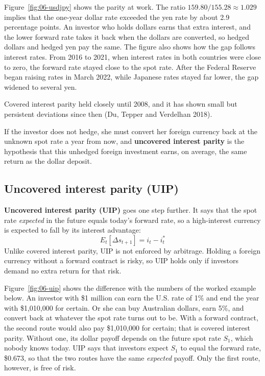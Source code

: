 Figure~\ref{fig:06-usdjpy} shows the parity at work. The ratio $159.80/155.28 \approx 1.029$ implies that the one-year dollar rate exceeded the yen rate by about 2.9 percentage points. An investor who holds dollars earns that extra interest, and the lower forward rate takes it back when the dollars are converted, so hedged dollars and hedged yen pay the same. The figure also shows how the gap follows interest rates. From 2016 to 2021, when interest rates in both countries were close to zero, the forward rate stayed close to the spot rate. After the Federal Reserve began raising rates in March 2022, while Japanese rates stayed far lower, the gap widened to several yen.

Covered interest parity held closely until 2008, and it has shown small but persistent deviations since then (Du, Tepper and Verdelhan 2018).

If the investor does not hedge, she must convert her foreign currency back at the unknown spot rate a year from now, and \textbf{uncovered interest parity} is the hypothesis that this unhedged foreign investment earns, on average, the same return as the dollar deposit.

\subsection{Uncovered interest parity (UIP)}

\textbf{Uncovered interest parity (UIP)} goes one step further. It says that the spot rate \emph{expected} in the future equals today's forward rate, so a high-interest currency is expected to fall by its interest advantage:
\begin{equation}
  E_t[\Delta s_{t+1}] = i_t - i^*_t
  \label{eq:06-uip}
\end{equation}
Unlike covered interest parity, UIP is not enforced by arbitrage. Holding a foreign currency without a forward contract is risky, so UIP holds only if investors demand no extra return for that risk.

Figure~\ref{fig:06-uip} shows the difference with the numbers of the worked example below. An investor with \$1 million can earn the U.S. rate of 1\% and end the year with \$1,010,000 for certain. Or she can buy Australian dollars, earn 5\%, and convert back at whatever the spot rate turns out to be. With a forward contract, the second route would also pay \$1,010,000 for certain; that is covered interest parity. Without one, its dollar payoff depends on the future spot rate $S_1$, which nobody knows today. UIP says that investors expect $S_1$ to equal the forward rate, \$0.673, so that the two routes have the same \emph{expected} payoff. Only the first route, however, is free of risk.

